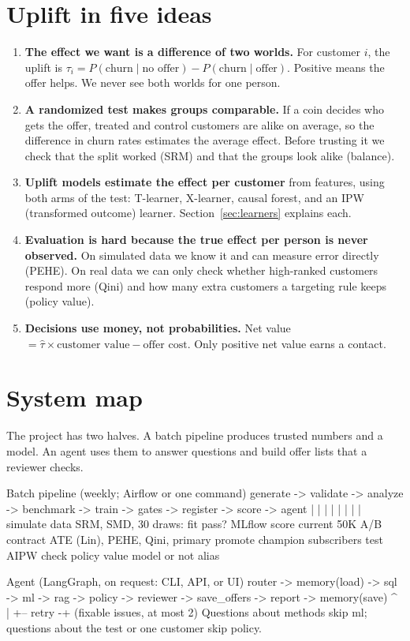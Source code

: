 \documentclass[11pt]{article}
\begin{document}
\section{Uplift in five ideas}
\begin{enumerate}
\item \textbf{The effect we want is a difference of two worlds.} For customer $i$, the uplift is $\tau_i = P(\text{churn} \mid \text{no offer}) - P(\text{churn} \mid \text{offer})$. Positive means the offer helps. We never see both worlds for one person.
\item \textbf{A randomized test makes groups comparable.} If a coin decides who gets the offer, treated and control customers are alike on average, so the difference in churn rates estimates the average effect. Before trusting it we check that the split worked (SRM) and that the groups look alike (balance).
\item \textbf{Uplift models estimate the effect per customer} from features, using both arms of the test: T-learner, X-learner, causal forest, and an IPW (transformed outcome) learner. Section~\ref{sec:learners} explains each.
\item \textbf{Evaluation is hard because the true effect per person is never observed.} On simulated data we know it and can measure error directly (PEHE). On real data we can only check whether high-ranked customers respond more (Qini) and how many extra customers a targeting rule keeps (policy value).
\item \textbf{Decisions use money, not probabilities.} Net value $= \hat\tau \times \text{customer value} - \text{offer cost}$. Only positive net value earns a contact.
\end{enumerate}

\section{System map}
The project has two halves. A batch pipeline produces trusted numbers and a model. An agent uses them to answer questions and build offer lists that a reviewer checks.

\begin{plaincode}
Batch pipeline (weekly; Airflow or one command)
  generate -> validate -> analyze -> benchmark -> train -> gates -> register -> score -> agent
     |           |           |            |          |        |         |          |
  simulate    data       SRM, SMD,    30 draws:    fit     pass?    MLflow     score current
  50K A/B     contract   ATE (Lin),   PEHE, Qini,  primary  promote  champion  subscribers
  test                   AIPW check   policy value model    or not   alias

Agent (LangGraph, on request: CLI, API, or UI)
  router -> memory(load) -> sql -> ml -> rag -> policy -> reviewer -> save_offers -> report -> memory(save)
                                                   ^          |
                                                   +-- retry -+  (fixable issues, at most 2)
  Questions about methods skip ml; questions about the test or one customer skip policy.
\end{plaincode}
\end{document}
